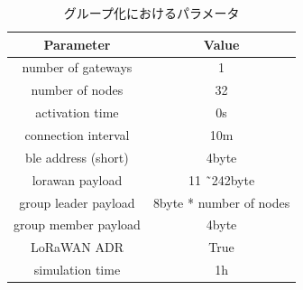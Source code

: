 \documentclass[Japanese]{dicomopapers}
\begin{document}
\begin{table}[h]
    \centering
    \caption{LoRaWANのユースケース}\label{fig:LoRaWAN_Usecase}
\end{table}

\begin{table}[h]
    \centering
    \caption{グループ化におけるパラメータ}\label{fig:group_parameter}
    \begin{tabular}{|c|c|}
    \hline
    \textbf{Parameter}     & \textbf{Value}                \\ \hline
    number of gateways     & 1                             \\ \hline
    number of nodes        & 32                            \\ \hline
    activation time        & 0s                            \\ \hline
    connection interval    & 10m                           \\ \hline
    ble address (short)    & 4byte                         \\ \hline
    lorawan payload        & 11 \~\ 242byte                \\ \hline
    group leader payload   & 8byte * number of nodes       \\ \hline
    group member payload   & 4byte                         \\ \hline
    LoRaWAN ADR            & True                          \\ \hline
    simulation time        & 1h                            \\ \hline
    \end{tabular}
\end{table}
\end{document}
